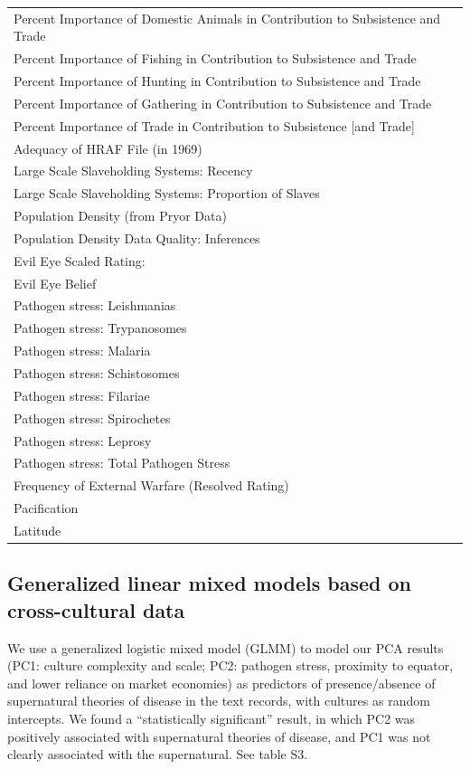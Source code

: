 \documentclass[
]{article}
\begin{document}
\begin{table}
\begin{tabular}[t]{l}
Percent Importance of Domestic Animals in Contribution to Subsistence and Trade\\
Percent Importance of Fishing in Contribution to Subsistence and Trade\\
Percent Importance of Hunting in Contribution to Subsistence and Trade\\
Percent Importance of Gathering in Contribution to Subsistence and Trade\\
\addlinespace
Percent Importance of Trade in Contribution to Subsistence [and Trade]\\
Adequacy of HRAF File (in 1969)\\
Large Scale Slaveholding Systems: Recency\\
Large Scale Slaveholding Systems: Proportion of Slaves\\
Population Density (from Pryor Data)\\
\addlinespace
Population Density Data Quality: Inferences\\
Evil Eye Scaled Rating:\\
Evil Eye Belief\\
Pathogen stress: Leishmanias\\
Pathogen stress: Trypanosomes\\
\addlinespace
Pathogen stress: Malaria\\
Pathogen stress: Schistosomes\\
Pathogen stress: Filariae\\
Pathogen stress: Spirochetes\\
Pathogen stress: Leprosy\\
\addlinespace
Pathogen stress: Total Pathogen Stress\\
Frequency of External Warfare (Resolved Rating)\\
Pacification\\
Latitude\\
\bottomrule
\end{tabular}
\end{table}

\hypertarget{generalized-linear-mixed-models-based-on-cross-cultural-data}{%
\subsection{Generalized linear mixed models based on cross-cultural data}\label{generalized-linear-mixed-models-based-on-cross-cultural-data}}

We use a generalized logistic mixed model (GLMM) to model our PCA results (PC1: culture complexity and scale; PC2: pathogen stress, proximity to equator, and lower reliance on market economies) as predictors of presence/absence of supernatural theories of disease in the text records, with cultures as random intercepts. We found a ``statistically significant'' result, in which PC2 was positively associated with supernatural theories of disease, and PC1 was not clearly associated with the supernatural. See table S3.
\end{document}
